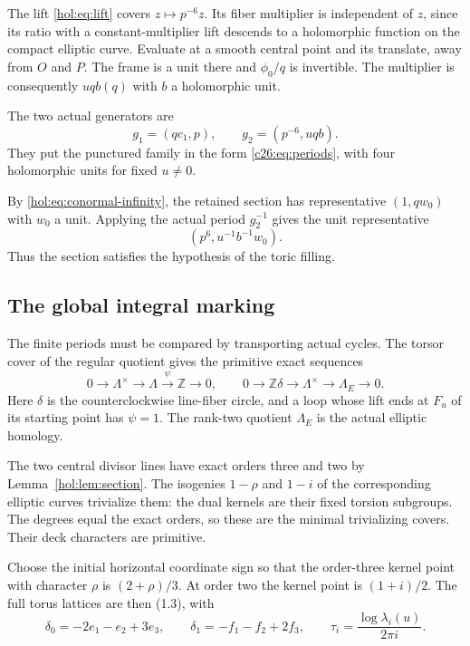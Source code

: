 \documentclass[11pt]{article}
\numberwithin{equation}{section}
\begin{document}
The lift \eqref{hol:eq:lift} covers $z\mapsto p^{-6}z$.
Its fiber multiplier is independent of $z$, since its ratio with a
constant-multiplier lift descends to a holomorphic function on the
compact elliptic curve. Evaluate at a smooth central point and its
translate, away from $O$ and $P$. The frame is a unit there and
$\phi_0/q$ is invertible. The multiplier is consequently
$u q b(q)$ with $b$ a holomorphic unit.

The two actual generators are
\begin{equation}\label{hol:eq:cusp-generators}
 g_1=(q c_1,p),\qquad g_2=(p^{-6},u q b).
\end{equation}
They put the punctured family in the form
\eqref{c26:eq:periods}, with four holomorphic units for fixed
$u\ne0$.

By \eqref{hol:eq:conormal-infinity}, the retained section has
representative $(1,qw_0)$ with $w_0$ a unit. Applying the actual
period $g_2^{-1}$ gives the unit representative
\begin{equation}\label{hol:eq:unit-section}
 (p^6,u^{-1}b^{-1}w_0).
\end{equation}
Thus the section satisfies the hypothesis of the toric filling.

\subsection{The global integral marking}\label{hol:sec:global-marking}

The finite periods must be compared by transporting actual cycles.
The torsor cover of the regular quotient gives the primitive exact
sequences
\[
 0\longrightarrow\Lambda^\times\longrightarrow\Lambda
   \xrightarrow{\psi}\mathbb Z\longrightarrow0,
 \qquad
 0\longrightarrow\mathbb Z\delta\longrightarrow\Lambda^\times
   \longrightarrow\Lambda_E\longrightarrow0.
\]
Here $\delta$ is the counterclockwise line-fiber circle, and a loop
whose lift ends at $F_u$ of its starting point has $\psi=1$.
The rank-two quotient $\Lambda_E$ is the actual elliptic homology.

The two central divisor lines have exact orders three and two by
Lemma~\ref{hol:lem:section}. The isogenies $1-\rho$ and $1-i$ of
the corresponding elliptic curves trivialize them: the dual kernels
are their fixed torsion subgroups. The degrees equal the exact
orders, so these are the minimal trivializing covers. Their deck
characters are primitive.

Choose the initial horizontal coordinate
sign so that the order-three kernel point with character $\rho$
is $(2+\rho)/3$. At order two the kernel point is $(1+i)/2$.
The full torus lattices are then (1.3), with
\[
 \delta_0=-2e_1-e_2+3e_3,\qquad
 \delta_1=-f_1-f_2+2f_3,
 \qquad \tau_i=\frac{\log\lambda_i(u)}{2\pi i}.
\]
\end{document}
